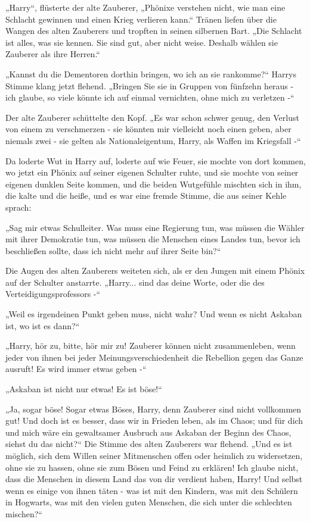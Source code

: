 {„Harry“, flüsterte der alte Zauberer, „Phönixe verstehen nicht, wie man eine Schlacht gewinnen und einen Krieg verlieren kann.“ Tränen liefen über die Wangen des alten Zauberers und tropften in seinen silbernen Bart. „Die Schlacht ist alles, was sie kennen. Sie sind gut, aber nicht weise. Deshalb wählen sie Zauberer als ihre Herren.“

„Kannst du die Dementoren dorthin bringen, wo ich an sie rankomme?“ Harrys Stimme klang jetzt flehend. „Bringen Sie sie in Gruppen von fünfzehn heraus - ich glaube, so viele könnte ich auf einmal vernichten, ohne mich zu verletzen -“

Der alte Zauberer schüttelte den Kopf. „Es war schon schwer genug, den Verlust von einem zu verschmerzen - sie könnten mir vielleicht noch einen geben, aber niemals zwei - sie gelten als Nationaleigentum, Harry, als Waffen im Kriegsfall -“

Da loderte Wut in Harry auf, loderte auf wie Feuer, sie mochte von dort kommen, wo jetzt ein Phönix auf seiner eigenen Schulter ruhte, und sie mochte von seiner eigenen dunklen Seite kommen, und die beiden Wutgefühle mischten sich in ihm, die kalte und die heiße, und es war eine fremde Stimme, die aus seiner Kehle sprach:

„Sag mir etwas Schulleiter. Was muss eine Regierung tun, was müssen die Wähler mit ihrer Demokratie tun, was müssen die Menschen eines Landes tun, bevor ich beschließen sollte, dass ich nicht mehr auf ihrer Seite bin?“

Die Augen des alten Zauberers weiteten sich, als er den Jungen mit einem Phönix auf der Schulter anstarrte. „Harry... sind das deine Worte, oder die des Verteidigungsprofessors -“

„Weil es irgendeinen Punkt geben muss, nicht wahr? Und wenn es nicht Askaban ist, wo ist es dann?“

„Harry, hör zu, bitte, hör mir zu! Zauberer können nicht zusammenleben, wenn jeder von ihnen bei jeder Meinungsverschiedenheit die Rebellion gegen das Ganze ausruft! Es wird immer etwas geben -“

„Askaban ist nicht nur etwas! Es ist böse!“

„Ja, sogar böse! Sogar etwas Böses, Harry, denn Zauberer sind nicht vollkommen gut! Und doch ist es besser, dass wir in Frieden leben, als im Chaos; und für dich und mich wäre ein gewaltsamer Ausbruch aus Askaban der Beginn des Chaos, siehst du das nicht?“ Die Stimme des alten Zauberers war flehend. „Und es ist möglich, sich dem Willen seiner Mitmenschen offen oder heimlich zu widersetzen, ohne sie zu hassen, ohne sie zum Bösen und Feind zu erklären! Ich glaube nicht, dass die Menschen in diesem Land das von dir verdient haben, Harry! Und selbst wenn es einige von ihnen täten - was ist mit den Kindern, was mit den Schülern in Hogwarts, was mit den vielen guten Menschen, die sich unter die schlechten mischen?“

}
